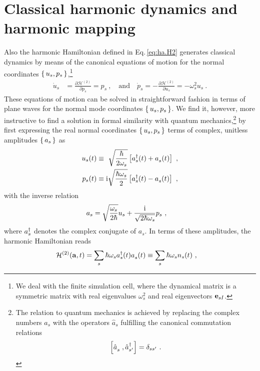\newpage

\section{Classical harmonic dynamics and harmonic mapping}
Also the harmonic Hamiltonian defined in Eq.\,\eqref{eq:ha.H2} generates classical dynamics by means of the canonical equations of motion for the normal coordinates $\set{ u_s, p_s}$,\footnote{We deal with the finite simulation cell, where the dynamical matrix is a symmetric matrix with real eigenvalues $\omega^2_s$ and real eigenvectors ${\bf e}_{sI}$.}
\begin{align}
\dot{u}_s
& = \frac{\partial \mathcal H^{(2)}}{\partial p_s}
= p_s~,\quad\text{and}\quad
\dot{p}_s
= - \frac{\partial \mathcal H^{(2)}}{\partial u_s}
= - \omega^2_s u_s~.
\label{eq:ha.canonical.eom}
\end{align}
These equations of motion can be solved in straightforward fashion in terms of plane waves for the normal mode coordinates $\set{u_s, p_s}$. We find it, however, more instructive to find a solution in formal similarity with quantum mechanics,\footnote{The relation to quantum mechanics is achieved by replacing the complex numbers $a_s$ with the operators $\hat{a}_s$ fulfilling the canonical commutation relations $$\left[ \fD{\hat{a}}_{\fP s}, \D{\hat a}_{s'} \right] = \delta_{ss'}~.$$} by first expressing the real normal coordinates $\set{u_s, p_s}$ terms of complex, unitless amplitudes $\set{a_s}$ as
\begin{subequations}
	\label{eq:u_s.amplitudes}
	\begin{align}
	u_s (t) 
	&\equiv ~ \sqrt{\frac{\hbar}{2 \omega_s}} \left[ \D a_s (t) + \fD a_s (t) \right]~, \\
	p_s (t) 
	&\equiv \im \sqrt{\frac{\hbar \omega_s}{2}} \left[ \D a_s (t) - \fD a_s (t) \right]~,
	\end{align}
\end{subequations}
with the inverse relation
\begin{align}
	a_s
	&= \sqrt{\frac{\omega_s}{2 \hbar}} u_s + \frac{\im}{\sqrt{2 \hbar \omega_s}} p_s 	\label{eq:a_st}~,
\end{align}
where ${a}^\dagger_s$ denotes the complex conjugate of $a_s$. 
In terms of these amplitudes, the harmonic Hamiltonian reads
\begin{align}
	\mathcal{H}^{(2)} (\b a, t)
		&= \sum_s \hbar \omega_s \D a_s (t) \fD a_s (t)
	\equiv \sum_s \hbar \omega_s n_s (t)~,
	\label{eq:Hamiltonian.aa}
\end{align}
